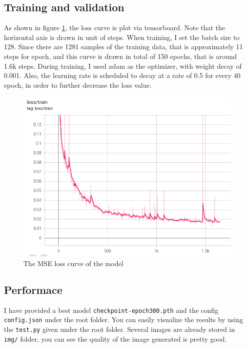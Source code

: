 \documentclass[a4paper, 10]{article}
\begin{document}
    \subsection{Training and validation}
            As shown in figure \ref{fig:2}, the loss curve is plot via 
            tensorboard. Note that the horizontal axis is drawn in 
            unit of steps. When training, I set the batch size 
            to 128. Since there are 1281 samples of the training data,
            that is approximately 11 steps for epoch, and this curve
            is drawn in total of 150 epochs, that is around 1.6k steps.
            During training, I used adam as the optimizer, with weight decay
            of 0.001. Also, the learning rate is scheduled to decay at a 
            rate of 0.5 for every 40 epoch, in order to further decrease
            the loss value.
    \begin{figure}[J]
        \centering
        \includegraphics[scale=0.5]{Learning-Curve1.png}
        \caption{The MSE loss curve of the model} \label{fig:2}
    \end{figure}
    \subsection{Performace}
        I have provided a best model \verb|checkpoint-epoch300.pth| and the config 
        \verb|config.json| under the root folder. You can easily visualize 
        the results by using the \verb|test.py| given under the root folder.
        Several images are already stored in \verb|img/| folder, you can 
        see the quality of the image generated is pretty good.
\end{document}
